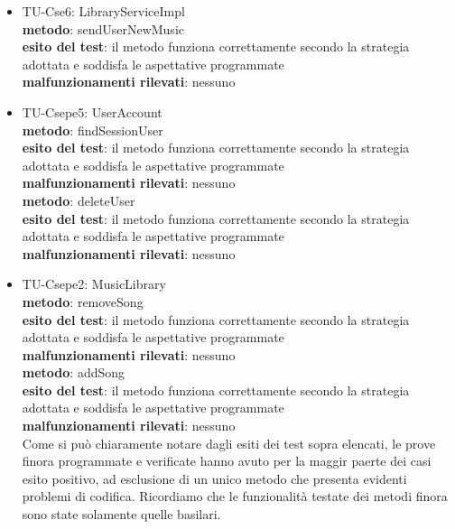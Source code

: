 \begin{itemize}
  \item TU-Cse6: LibraryServiceImpl\\
  \textbf{metodo}: sendUserNewMusic\\
  \textbf{esito del test}: il metodo funziona correttamente secondo la strategia
  adottata e soddisfa le aspettative programmate\\
  \textbf{malfunzionamenti rilevati}: nessuno\\
  
  \item TU-Csepe5: UserAccount\\
  \textbf{metodo}: findSessionUser\\
  \textbf{esito del test}: il metodo funziona correttamente secondo la strategia
  adottata e soddisfa le aspettative programmate\\
  \textbf{malfunzionamenti rilevati}: nessuno\\
  
  \textbf{metodo}: deleteUser\\
  \textbf{esito del test}: il metodo funziona correttamente secondo la strategia
  adottata e soddisfa le aspettative programmate\\
  \textbf{malfunzionamenti rilevati}: nessuno\\
  
  \item TU-Csepe2: MusicLibrary\\
  \textbf{metodo}: removeSong\\
  \textbf{esito del test}: il metodo funziona correttamente secondo la strategia
  adottata e soddisfa le aspettative programmate\\
  \textbf{malfunzionamenti rilevati}: nessuno\\
  
  \textbf{metodo}: addSong\\
  \textbf{esito del test}: il metodo funziona correttamente secondo la strategia
  adottata e soddisfa le aspettative programmate\\
  \textbf{malfunzionamenti rilevati}: nessuno\\
  
  Come si pu\`o chiaramente notare dagli esiti dei test sopra elencati, le prove
  finora programmate e verificate hanno avuto per la maggir paerte dei
  casi esito positivo, ad esclusione di un unico metodo che presenta evidenti
  problemi di codifica. Ricordiamo che le funzionalit\`a testate dei metodi finora 
  sono state solamente quelle basilari.
  
\end{itemize}



